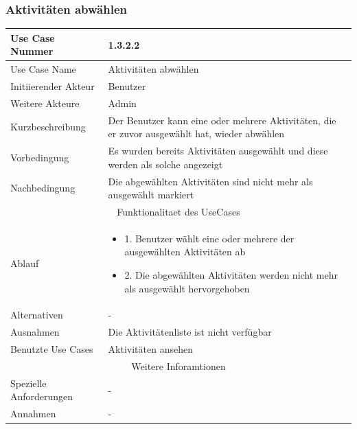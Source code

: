 \documentclass[10pt,a4paper]{article}
\begin{document}
	\subsubsection{Aktivit\"aten abw\"ahlen}
	\begin{tabular}{|l|p{.5\linewidth}|}
	\hline Use Case Nummer & 1.3.2.2 \\ 
	\hline Use Case Name & Aktivit\"aten abw\"ahlen \\ 
	\hline Initiierender Akteur & Benutzer \\
	\hline Weitere Akteure & Admin \\
	\hline Kurzbeschreibung & Der Benutzer kann eine oder mehrere Aktivit\"aten, die er zuvor ausgew\"ahlt hat, wieder abw\"ahlen \\
	\hline Vorbedingung & Es wurden bereits Aktivit\"aten ausgew\"ahlt und diese werden als solche angezeigt \\
	\hline Nachbedingung & Die abgew\"ahlten Aktivit\"aten sind nicht mehr als ausgew\"ahlt markiert \\
	\hline \multicolumn{2}{|c|}{Funktionalitaet des UseCases}\\
	\hline Ablauf & \begin{itemize}
			\item 1. Benutzer w\"ahlt eine oder mehrere der ausgew\"ahlten Aktivit\"aten ab
			\item 2. Die abgew\"ahlten Aktivit\"aten werden nicht mehr als ausgew\"ahlt hervorgehoben
		\end{itemize} \\
	\hline Alternativen & - \\
	\hline Ausnahmen & Die Aktivit\"atenliste ist nicht verf\"ugbar \\
	\hline Benutzte Use Cases & Aktivit\"aten ansehen \\
	\hline \multicolumn{2}{|c|}{Weitere Inforamtionen} \\
	\hline Spezielle Anforderungen & - \\
	\hline Annahmen & - \\
	\hline
	\end{tabular} 
	
\end{document}
